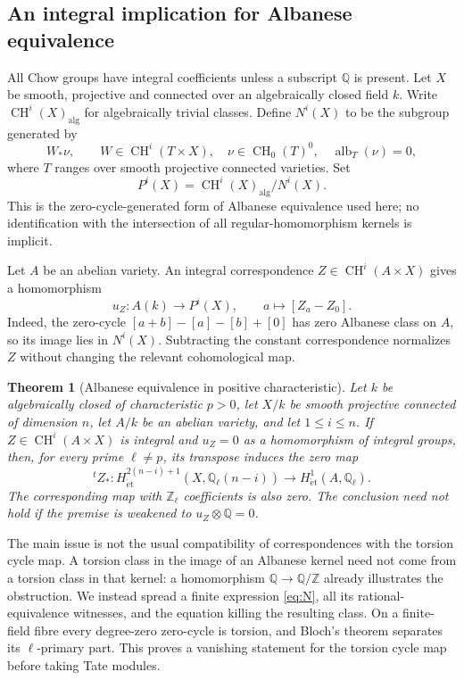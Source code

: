 \documentclass[11pt]{article}
\newcommand{\CH}{\operatorname{CH}}
\newcommand{\Z}{\mathbb Z}
\newcommand{\Q}{\mathbb Q}
\newcommand{\alg}{\mathrm{alg}}
\newcommand{\et}{\mathrm{\acute et}}
\newtheorem{theorem}{Theorem}[section]
\theoremstyle{definition}
\theoremstyle{remark}
\begin{document}
\subsection{An integral implication for Albanese equivalence}

All Chow groups have integral coefficients unless a subscript $\Q$ is present. Let $X$ be smooth, projective and connected over an algebraically closed field $k$. Write $\CH^i(X)_{\alg}$ for algebraically trivial classes. Define $N^i(X)$ to be the subgroup generated by
\begin{equation}\label{eq:N}
 W_*\nu,\qquad W\in\CH^i(T\times X),\quad
 \nu\in\CH_0(T)^0,\quad \operatorname{alb}_T(\nu)=0,
\end{equation}
where $T$ ranges over smooth projective connected varieties. Set
\[
                  P^i(X)=\CH^i(X)_{\alg}/N^i(X).
\]
This is the zero-cycle-generated form of Albanese equivalence used here; no identification with the intersection of all regular-homomorphism kernels is implicit.

Let $A$ be an abelian variety. An integral correspondence $Z\in\CH^i(A\times X)$ gives a homomorphism
\[
 u_Z:A(k)\longrightarrow P^i(X),\qquad
 a\longmapsto [Z_a-Z_0].
\]
Indeed, the zero-cycle $[a+b]-[a]-[b]+[0]$ has zero Albanese class on $A$, so its image lies in $N^i(X)$. Subtracting the constant correspondence normalizes $Z$ without changing the relevant cohomological map.

\begin{theorem}[Albanese equivalence in positive characteristic]\label{thm:alb}
Let $k$ be algebraically closed of characteristic $p>0$, let $X/k$ be smooth projective connected of dimension $n$, let $A/k$ be an abelian variety, and let $1\leq i\leq n$. If $Z\in\CH^i(A\times X)$ is integral and $u_Z=0$ as a homomorphism of integral groups, then, for every prime $\ell\ne p$, its transpose induces the zero map
\[
 {}^tZ_*:H^{2(n-i)+1}_{\et}(X,\Q_\ell(n-i))
                  \longrightarrow H^1_{\et}(A,\Q_\ell).
\]
The corresponding map with $\Z_\ell$ coefficients is also zero. The conclusion need not hold if the premise is weakened to $u_Z\otimes\Q=0$.
\end{theorem}

The main issue is not the usual compatibility of correspondences with the torsion cycle map. A torsion class in the image of an Albanese kernel need not come from a torsion class in that kernel: a homomorphism $\Q\to\Q/\Z$ already illustrates the obstruction. We instead spread a finite expression \eqref{eq:N}, all its rational-equivalence witnesses, and the equation killing the resulting class. On a finite-field fibre every degree-zero zero-cycle is torsion, and Bloch's theorem separates its $\ell$-primary part. This proves a vanishing statement for the torsion cycle map before taking Tate modules.
\end{document}
